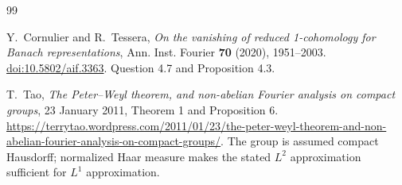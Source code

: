 \documentclass[11pt,a4paper]{article}
\theoremstyle{remark}
\begin{document}
\begin{thebibliography}{99}
\small
\setlength{\itemsep}{3pt}

Y.~Cornulier and R.~Tessera,
\emph{On the vanishing of reduced 1-cohomology for Banach representations},
Ann. Inst. Fourier \textbf{70} (2020), 1951--2003.
\href{https://doi.org/10.5802/aif.3363}{doi:10.5802/aif.3363}.
Question 4.7 and Proposition 4.3.

T.~Tao,
\emph{The Peter--Weyl theorem, and non-abelian Fourier analysis on compact groups},
23 January 2011, Theorem 1 and Proposition 6.
\url{https://terrytao.wordpress.com/2011/01/23/the-peter-weyl-theorem-and-non-abelian-fourier-analysis-on-compact-groups/}.
The group is assumed compact Hausdorff; normalized Haar measure makes
the stated $L^2$ approximation sufficient for $L^1$ approximation.

\end{thebibliography}
\end{document}
